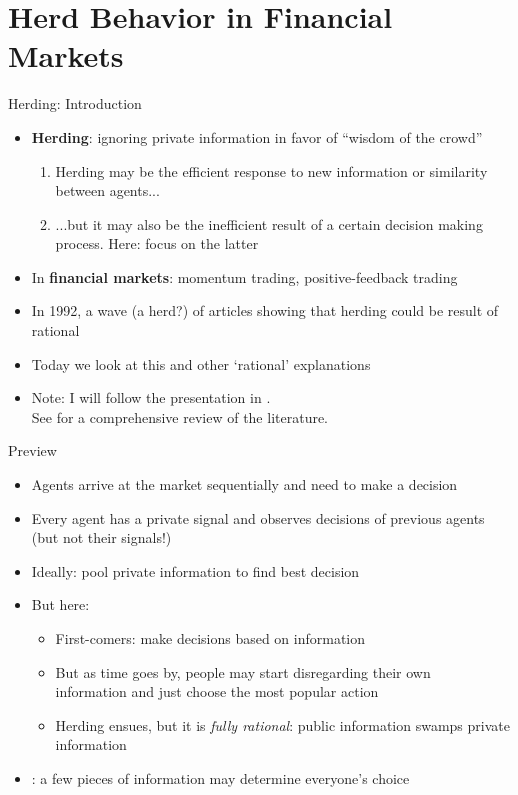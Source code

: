 \documentclass[english,10pt
,aspectratio=169
]{beamer}
\begin{document}
\section{Herd Behavior in Financial Markets}

\begin{frame}{Herding: Introduction}
	\begin{itemize}
		\item \textbf{Herding}: ignoring private information in favor of ``wisdom of the crowd''
		\begin{enumerate}
			\item Herding may be the efficient response to new information or similarity between agents...
			\item ...but it may also be the inefficient result of a certain decision making process. Here: focus on the latter
		\end{enumerate}
		\item In \textbf{financial markets}: momentum trading, positive-feedback trading
		\item In 1992, a wave (a herd?) of articles showing that  herding could be result of rational 
		\item Today we look at this and other `rational' explanations
		\item Note: I will follow the presentation in \cite{bikhchandani_herd_2000}. 
		\\See \cite{bikhchandani_information_2021} for a comprehensive review of the literature.
	\end{itemize}
\end{frame}


\begin{frame}{Preview}
	\begin{itemize}
		\item Agents arrive at the market sequentially and need to make a decision
		\item Every agent has a private signal and observes decisions of previous agents (but not their signals!)
		\item Ideally: pool private information to find best decision
		\item But here: 
		\begin{itemize}
			\item First-comers: make decisions based on information
			\item But as time goes by, people may start disregarding their own
			\\ information and just choose the most popular action
			\item Herding ensues, but it is \emph{fully rational}: public information swamps private information
		\end{itemize}
		\item {}: a few pieces of information may determine everyone's choice
	\end{itemize}
\end{frame}
\end{document}
